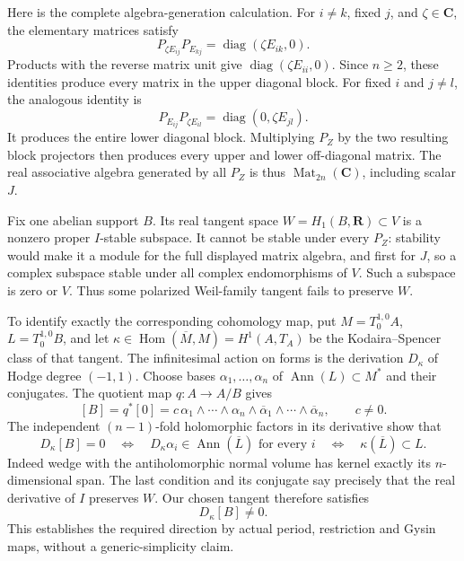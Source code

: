 Here is the complete algebra-generation calculation. For
$i\ne k$, fixed $j$, and $\zeta\in\mathbf C$, the elementary
matrices satisfy
\[
 P_{\zeta E_{ij}}P_{E_{kj}}
          =\operatorname{diag}(\zeta E_{ik},0).
 \tag{F1R5.6}
\]
Products with the reverse matrix unit give
$\operatorname{diag}(\zeta E_{ii},0)$. Since $n\ge2$, these
identities produce every matrix in the upper diagonal block.
For fixed $i$ and $j\ne l$, the analogous identity is
\[
 P_{E_{ij}}P_{\zeta E_{il}}
          =\operatorname{diag}(0,\zeta E_{jl}).
 \tag{F1R5.7}
\]
It produces the entire lower diagonal block. Multiplying
$P_Z$ by the two resulting block projectors then produces
every upper and lower off-diagonal matrix. The real associative
algebra generated by all $P_Z$ is thus
$\operatorname{Mat}_{2n}(\mathbf C)$, including scalar $J$.

Fix one abelian support $B$. Its real tangent space
$W=H_1(B,\mathbf R)\subset V$ is a nonzero proper $I$-stable
subspace. It cannot be stable under every $P_Z$: stability
would make it a module for the full displayed matrix algebra,
and first for $J$, so a complex subspace stable under all
complex endomorphisms of $V$. Such a subspace is zero or $V$.
Thus some polarized Weil-family tangent fails to preserve $W$.

To identify exactly the corresponding cohomology map, put
$M=T_0^{1,0}A$, $L=T_0^{1,0}B$, and let
$\kappa\in\operatorname{Hom}(\overline M,M)
 =H^1(A,T_A)$ be the Kodaira--Spencer class of that tangent.
The infinitesimal action on forms is the derivation
$D_\kappa$ of Hodge degree $(-1,1)$.
Choose bases $\alpha_1,\ldots,\alpha_n$ of
$\operatorname{Ann}(L)\subset M^*$ and their conjugates.
The quotient map $q:A\to A/B$ gives
\[
 [B]=q^*[0]
      =c\,\alpha_1\wedge\cdots\wedge\alpha_n
                  \wedge\overline\alpha_1\wedge\cdots
                          \wedge\overline\alpha_n,
 \qquad c\ne0.
 \tag{F1R5.8}
\]
The independent $(n-1)$-fold holomorphic factors in its
derivative show that
\[
 D_\kappa[B]=0
 \quad\Longleftrightarrow\quad
 D_\kappa\alpha_i\in\operatorname{Ann}(\overline L)
          \text{ for every }i
 \quad\Longleftrightarrow\quad
 \kappa(\overline L)\subset L.
 \tag{F1R5.9}
\]
Indeed wedge with the antiholomorphic normal volume has kernel
exactly its $n$-dimensional span. The last condition and its
conjugate say precisely that the real derivative of $I$
preserves $W$. Our chosen tangent therefore satisfies
\[
                         D_\kappa[B]\ne0.
 \tag{F1R5.10}
\]
This establishes the required direction by actual period,
restriction and Gysin maps, without a generic-simplicity claim.

